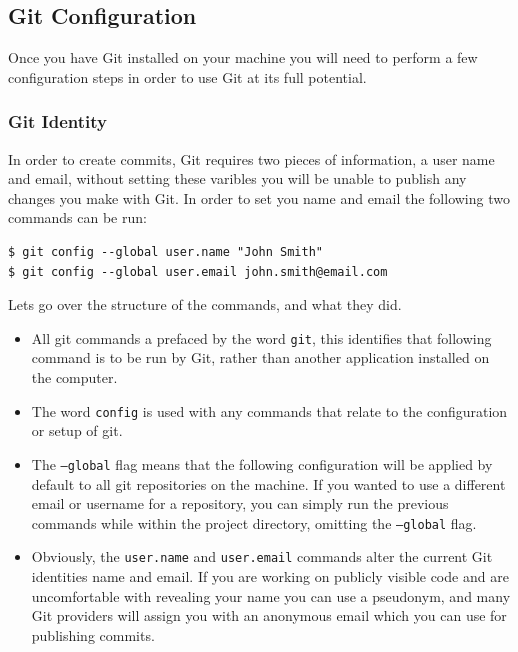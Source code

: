 \documentclass[10pt, a4paper, titlepage]{article}
\begin{document}
\subsection{Git Configuration}
Once you have Git installed on your machine you will need to perform a few
configuration steps in order to use Git at its full potential.

\subsubsection{Git Identity}
In order to create commits, Git requires two pieces of information, a user
name and email, without setting these varibles you will be unable to publish
any changes you make with Git.
In order to set you name and email the following two commands can be run:

\begin{lstlisting}[label=lst_config_user,
caption=Updating the default Git identity]
$ git config --global user.name "John Smith"
$ git config --global user.email john.smith@email.com
\end{lstlisting}


\noindent
Lets go over the structure of the commands, and what they did.

\begin {itemize}
\item
All git commands a prefaced by the word {\tt git}, this identifies that
following command is to be run by Git, rather than another application
installed on the computer.

\item
The word {\tt config} is used with any commands that relate to the
configuration or setup of git.

\item
The {\tt --global} flag means that the following configuration will be applied
by default to all git repositories on the machine.
If you wanted to use a different email or username for a repository, you can
simply run the previous commands while within the project directory, omitting
the {\tt --global} flag.

\item
Obviously, the {\tt user.name} and {\tt user.email} commands alter the current
Git identities name and email.
If you are working on publicly visible code and are uncomfortable with
revealing your name you can use a pseudonym, and many Git providers will
assign you with an anonymous email which you can use for publishing commits.
\end{itemize}
\end{document}
